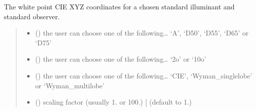 \documentclass[letterpaper,10pt,english]{sphinxmanual}
\begin{document}

\begin{fulllineitems}
\label{\detokenize{07_colors:skinoptics.colors.XYZ_wp}}
\pysigstartsignatures
{}
\pysigstopsignatures
\sphinxAtStartPar
The white point CIE XYZ coordinates for a chosen standard illuminant and standard observer.
\begin{quote}\begin{description}
\begin{itemize}
\item {} 
\sphinxAtStartPar
{} () \textendash{} the user can choose one of the following… ‘A’, ‘D50’, ‘D55’, ‘D65’ or ‘D75’

\item {} 
\sphinxAtStartPar
{} () \textendash{} the user can choose one of the following… ‘2o’ or ‘10o’

\item {} 
\sphinxAtStartPar
{} (\sphinxstyleliteralemphasis{\sphinxupquote{ (}}\sphinxstyleliteralemphasis{\sphinxupquote{)}}) \textendash{} the user can choose one of the following… ‘CIE’, ‘Wyman\_singlelobe’ or ‘Wyman\_multilobe’

\item {} 
\sphinxAtStartPar
{} () \textendash{} scaling factor (usually 1. or 100.) {[}\sphinxhyphen{}{]} (default to 1.)

\end{itemize}

\end{description}\end{quote}


\end{fulllineitems}
\end{document}

